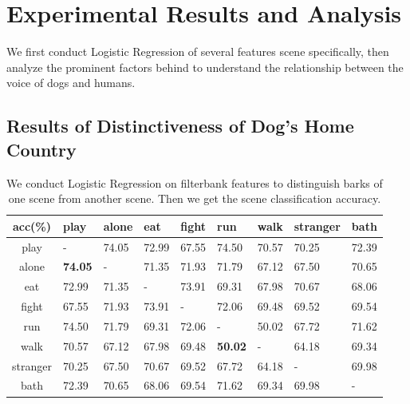 \section{Experimental Results and Analysis}
We first conduct Logistic Regression of several features scene specifically, then analyze the prominent factors behind to understand the relationship between the voice of dogs and humans.

\subsection{Results of Distinctiveness of Dog's Home Country}
\label{sec:main}



\begin{table}[th]
    \setlength\tabcolsep{3.5pt}
	\scriptsize
	\centering
	\begin{tabular}{l|llllllll}
		\toprule
		\multicolumn{1}{c|}{acc(\%)}        & play   & alone & eat   & fight & run   & walk & stranger & bath  \\
		\midrule
		\multicolumn{1}{c|}{play}           & -      & 74.05 & 72.99 & 67.55 & 74.50 & 70.57 & 70.25 & 72.39    \\
		\midrule
		\multicolumn{1}{c|}{alone}          & \textbf{74.05}  & -     & 71.35 & 71.93 & 71.79 & 67.12 & 67.50 & 70.65    \\
		\midrule
		\multicolumn{1}{c|}{eat}            & 72.99  & 71.35 & -     & 73.91 & 69.31 & 67.98 & 70.67 & 68.06    \\
		\midrule
		\multicolumn{1}{c|}{fight}          & 67.55  & 71.93 & 73.91 &  -    & 72.06 & 69.48 & 69.52 & 69.54  \\
		\midrule
		\multicolumn{1}{c|}{run}            & 74.50  & 71.79 & 69.31 & 72.06 & -     & 50.02 & 67.72 & 71.62    \\
		\midrule
		\multicolumn{1}{c|}{walk}           & 70.57  & 67.12 & 67.98 & 69.48 & \textbf{50.02} & -     & 64.18 & 69.34\\
		\midrule
		\multicolumn{1}{c|}{stranger}       & 70.25  & 67.50 & 70.67 & 69.52 & 67.72 & 64.18 & -     & 69.98\\
		\midrule
		\multicolumn{1}{c|}{bath}           & 72.39  & 70.65 & 68.06 & 69.54 & 71.62 & 69.34 & 69.98 & -  \\
		\bottomrule
	\end{tabular}
	\caption{We conduct Logistic Regression on filterbank features to distinguish barks of one scene from another scene. Then we get the scene classification accuracy.}
	\label{table:fusion}
\end{table}

